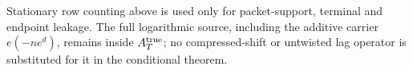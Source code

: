 \begin{remark}
Stationary row counting above is used only for packet-support, terminal and
endpoint leakage.  The full logarithmic source, including the additive carrier
$e(-ne^d)$, remains inside $A_T^{\rm true}$; no compressed-shift or untwisted
lag operator is substituted for it in the conditional theorem.
\end{remark}
